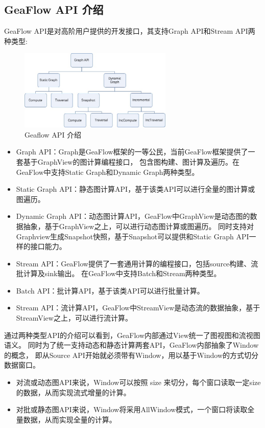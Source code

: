 \subsection{GeaFlow API 介绍}
GeaFlow API是对高阶用户提供的开发接口，其支持Graph API和Stream API两种类型:
\begin{figure}[H]
  \begin{center}
    \includegraphics[width=0.65\textwidth]{./figures/api_arch.jpeg}
  \end{center}
  \caption{Geaflow API 介绍}
\end{figure}
\begin{itemize}
  \item Graph API：Graph是GeaFlow框架的一等公民，当前GeaFlow框架提供了一套基于GraphView的图计算编程接口，
    包含图构建、图计算及遍历。在GeaFlow中支持Static Graph和Dynamic Graph两种类型。
  \item Static Graph API：静态图计算API，基于该类API可以进行全量的图计算或图遍历。
  \item Dynamic Graph API：动态图计算API，GeaFlow中GraphView是动态图的数据抽象，基于GraphView之上，可以进行动态图计算或图遍历。
    同时支持对Graphview生成Snapshot快照，基于Snapshot可以提供和Static Graph API一样的接口能力。
  \item Stream API：GeaFlow提供了一套通用计算的编程接口，包括source构建、流批计算及sink输出。
    在GeaFlow中支持Batch和Stream两种类型。
  \item Batch API：批计算API，基于该类API可以进行批量计算。
  \item Stream API：流计算API，GeaFlow中StreamView是动态流的数据抽象，基于StreamView之上，可以进行流计算。
\end{itemize}

通过两种类型API的介绍可以看到，GeaFlow内部通过View统一了图视图和流视图语义。
同时为了统一支持动态和静态计算两套API，GeaFlow内部抽象了Window的概念，
即从Source API开始就必须带有Window，用以基于Window的方式切分数据窗口。

\begin{itemize}
  \item 对流或动态图API来说，Window可以按照 size 来切分，每个窗口读取一定size的数据，从而实现流式增量的计算。
  \item 对批或静态图API来说，Window将采用AllWindow模式，一个窗口将读取全量数据，从而实现全量的计算。
\end{itemize}

